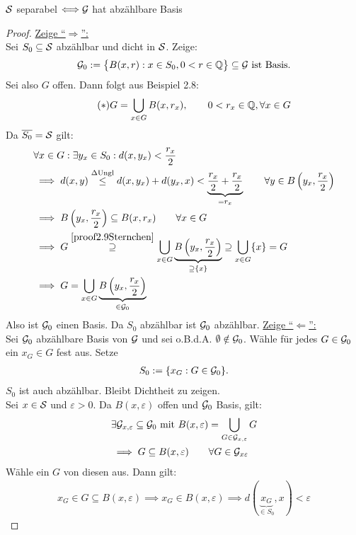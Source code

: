 \begin{satz}\label{satz2.9}
$\S$ separabel $\Longleftrightarrow\G$ hat abzählbare Basis
\end{satz}
\begin{proof}
\underline{Zeige ``$\Rightarrow$'':}\\
Sei $S_0\subseteq\S$ abzählbar und dicht in $\S$. Zeige:
\begin{align*}
\G_0:=\big\lbrace B(x,r):x\in S_0,0<r\in\Q\big\rbrace\subseteq\G\text{ ist Basis.}
\end{align*}
Sei also $G$ offen. Dann folgt aus Beispiel 2.8:
\begin{align}\label{proof2.9Sternchen}\tag{$\ast$}
G=\bigcup\limits_{x\in G} B(x,r_x),\qquad 0<r_x\in\Q,\forall x\in G
\end{align}
Da $\overline{S_0}=\S$ gilt:
\begin{align*}
&\forall x\in G:\exists y_x\in S_0: d(x,y_x)<\frac{r_x}{2}\\
&\implies d(x,y)
\stackrel{\Delta\text{Ungl}}{\leq}
d(x,y_x)+d(y_x,x)< \underbrace{\frac{r_x}{2}+\frac{r_x}{2}}_{=r_x}\qquad\forall y\in B\left(y_x,\frac{r_x}{2}\right)\\
&\implies B\left(y_x,\frac{r_x}{2}\right)\subseteq B(x,r_x)\qquad\forall x\in G\\
&\implies G\stackrel{\eqref{proof2.9Sternchen}}{\supseteq}
\bigcup\limits_{x\in G}\underbrace{B\left(y_x,\frac{r_x}{2}\right)}_{\supseteq\lbrace x\rbrace}
\supseteq\bigcup\limits_{x\in G}\lbrace x\rbrace=G\\
&\implies G=\bigcup	\limits_{x\in G}\underbrace{B\left(y_x,\frac{r_x}{2}\right)}_{\in\G_0}
\end{align*}
Also ist $\G_0$ einen Basis. Da $S_0$ abzählbar ist $\G_0$ abzählbar.\nl
\underline{Zeige ``$\Leftarrow$'':}\\
Sei $\G_0$ abzählbare Basis von $\G$ und sei o.B.d.A. $\emptyset\notin\G_0$. Wähle für jedes $G\in\G_0$ ein $x_G\in G$ fest aus. Setze
\begin{align*}
S_0:=\lbrace x_G:G\in\G_0\rbrace.
\end{align*}
$S_0$ ist auch abzählbar. Bleibt Dichtheit zu zeigen.\\
Sei $x\in\S$ und $\varepsilon>0$. Da $B(x,\varepsilon)$ offen und $\G_0$ Basis, gilt: 
\begin{align*}
&\exists\G_{x,\varepsilon}\subseteq\G_0\mit B(x,\varepsilon)=\bigcup\limits_{G\in\G_{x,\varepsilon}} G\\
&\implies G\subseteq B(x,\varepsilon)\qquad\forall G\in\G_{x\varepsilon}
\end{align*}
Wähle ein $G$ von diesen aus. Dann gilt:
\begin{align*}
x_G\in G\subseteq B(x,\varepsilon)
\implies x_G\in B(x,\varepsilon)
\implies d(\underbrace{x_G}_{\in S_0},x)<\varepsilon
\end{align*}
\end{proof}


